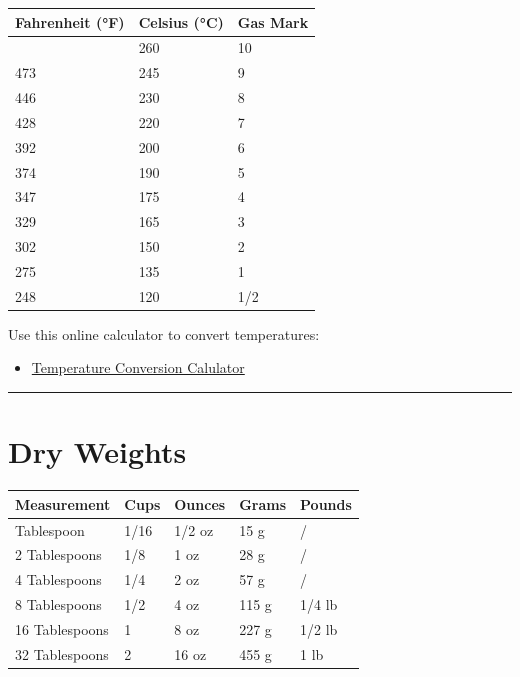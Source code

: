 \documentclass[
]{book}
\providecommand{\tightlist}{%
  \setlength{\itemsep}{0pt}\setlength{\parskip}{0pt}}
\begin{document}
\begin{longtable}[]{@{}lll@{}}
\toprule\noalign{}
\textbf{Fahrenheit (°F)} & \textbf{Celsius (°C)} & \textbf{Gas Mark} \\
\midrule\noalign{}
\endhead
\bottomrule\noalign{}
\endlastfoot
500 & 260 & 10 \\
473 & 245 & 9 \\
446 & 230 & 8 \\
428 & 220 & 7 \\
392 & 200 & 6 \\
374 & 190 & 5 \\
347 & 175 & 4 \\
329 & 165 & 3 \\
302 & 150 & 2 \\
275 & 135 & 1 \\
248 & 120 & 1/2 \\
\end{longtable}

Use this online calculator to convert temperatures:

\begin{itemize}
\tightlist
\item
  \href{https://www.unitconverters.net/temperature-converter.html}{Temperature
  Conversion Calulator}
\end{itemize}

\begin{center}\rule{0.5\linewidth}{0.5pt}\end{center}

\section*{Dry Weights}\label{dry-weights}

\begin{longtable}[]{@{}lllll@{}}
\toprule\noalign{}
Measurement & Cups & Ounces & Grams & Pounds \\
\midrule\noalign{}
\endhead
\bottomrule\noalign{}
\endlastfoot
1 Tablespoon & 1/16 & 1/2 oz & 15 g & / \\
2 Tablespoons & 1/8 & 1 oz & 28 g & / \\
4 Tablespoons & 1/4 & 2 oz & 57 g & / \\
8 Tablespoons & 1/2 & 4 oz & 115 g & 1/4 lb \\
16 Tablespoons & 1 & 8 oz & 227 g & 1/2 lb \\
32 Tablespoons & 2 & 16 oz & 455 g & 1 lb \\
\end{longtable}
\end{document}
